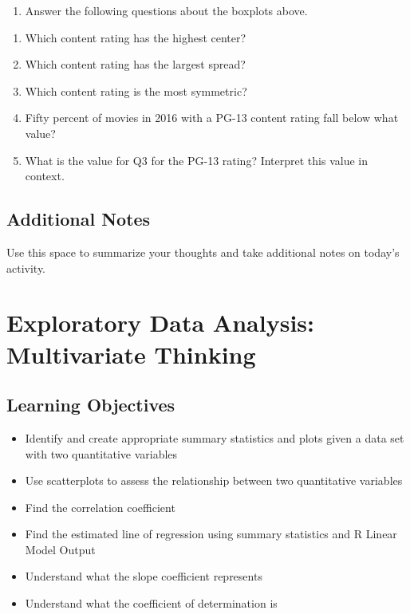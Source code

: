 \documentclass[
]{report}
\providecommand{\tightlist}{%
  \setlength{\itemsep}{0pt}\setlength{\parskip}{0pt}}
\begin{document}
\begin{enumerate}
\def\labelenumi{\arabic{enumi}.}
\setcounter{enumi}{10}
\tightlist
\item
  Answer the following questions about the boxplots above.
\end{enumerate}

\begin{enumerate}
\def\labelenumi{\alph{enumi}.}
\item
  Which content rating has the highest center?
  \vspace{0.5in}
\item
  Which content rating has the largest spread?
  \vspace{0.5in}
\item
  Which content rating is the most symmetric?
  \vspace{0.5in}
\item
  Fifty percent of movies in 2016 with a PG-13 content rating fall below what value?
  \vspace{0.5in}
\item
  What is the value for Q3 for the PG-13 rating? Interpret this value in context.
  \vspace{1in}
\end{enumerate}

\hypertarget{additional-notes}{%
\section{Additional Notes}\label{additional-notes}}

Use this space to summarize your thoughts and take additional notes on today's activity.

\hypertarget{exploratory-data-analysis-multivariate-thinking}{%
\chapter{Exploratory Data Analysis: Multivariate Thinking}\label{exploratory-data-analysis-multivariate-thinking}}

\hypertarget{learning-objectives}{%
\section{Learning Objectives}\label{learning-objectives}}

\begin{itemize}
\item
  Identify and create appropriate summary statistics and plots
  given a data set with two quantitative variables
\item
  Use scatterplots to assess the relationship between two quantitative variables
\item
  Find the correlation coefficient
\item
  Find the estimated line of regression using summary statistics and R Linear Model Output
\item
  Understand what the slope coefficient represents
\item
  Understand what the coefficient of determination is
\end{itemize}
\end{document}
